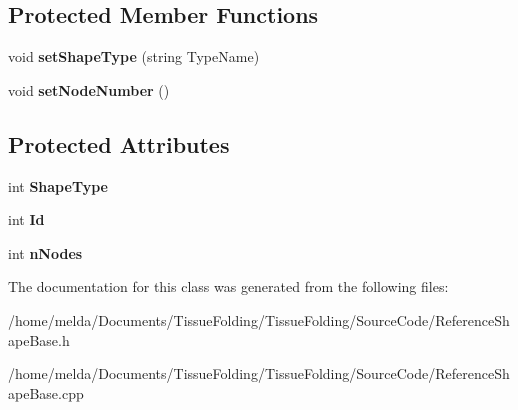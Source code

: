 \subsection*{Protected Member Functions}
\begin{DoxyCompactItemize}
\item 
\hypertarget{classReferenceShapeBase_ad893cb0986899d77de34ce5e565ebb97}{}void {\bfseries set\+Shape\+Type} (string Type\+Name)\label{classReferenceShapeBase_ad893cb0986899d77de34ce5e565ebb97}

\item 
\hypertarget{classReferenceShapeBase_a027db08b5e580286448380aa21902b33}{}void {\bfseries set\+Node\+Number} ()\label{classReferenceShapeBase_a027db08b5e580286448380aa21902b33}

\end{DoxyCompactItemize}
\subsection*{Protected Attributes}
\begin{DoxyCompactItemize}
\item 
\hypertarget{classReferenceShapeBase_a4831a54cffbafef4ded26fb8c50566e0}{}int {\bfseries Shape\+Type}\label{classReferenceShapeBase_a4831a54cffbafef4ded26fb8c50566e0}

\item 
\hypertarget{classReferenceShapeBase_af0da93cee3f17800d7aa90b21b1b81c7}{}int {\bfseries Id}\label{classReferenceShapeBase_af0da93cee3f17800d7aa90b21b1b81c7}

\item 
\hypertarget{classReferenceShapeBase_a1183c092056a3245a350ff6f56632633}{}int {\bfseries n\+Nodes}\label{classReferenceShapeBase_a1183c092056a3245a350ff6f56632633}

\end{DoxyCompactItemize}


The documentation for this class was generated from the following files\+:\begin{DoxyCompactItemize}
\item 
/home/melda/\+Documents/\+Tissue\+Folding/\+Tissue\+Folding/\+Source\+Code/Reference\+Shape\+Base.\+h\item 
/home/melda/\+Documents/\+Tissue\+Folding/\+Tissue\+Folding/\+Source\+Code/Reference\+Shape\+Base.\+cpp\end{DoxyCompactItemize}
